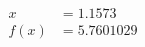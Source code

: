 \documentclass[preview]{standalone}
\begin{document}
\begin{align*}
x &= 1.1573\\f(x) &= 5.7601029
\end{align*}
\end{document}
